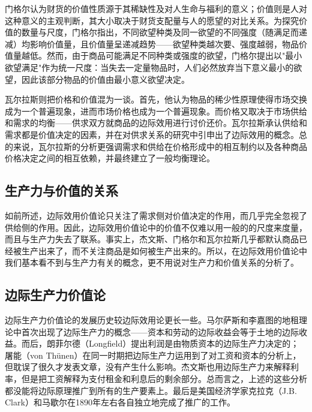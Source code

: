 门格尔认为财货的价值性质源于其稀缺性及对人生命与福利的意义；价值则是人对这种意义的主观判断，其大小取决于财货支配量与人的愿望的对比关系。为探究价值的数量与尺度，门格尔指出，不同欲望种类及同一欲望的不同强度（随满足而递减）均影响价值量，且价值量呈递减趋势——欲望种类越次要、强度越弱，物品价值量越低。然而，由于商品可能满足不同种类或强度的欲望，门格尔提出以"最小欲望满足"作为统一尺度：当失去一定量物品时，人们必然放弃当下意义最小的欲望，因此该部分物品的价值由最小意义欲望决定。\cite[167-172]{YanZhiJieCongBianJiGeMingDaoKaiEnSiGeMing2022}\cite[52-80]{QiaEr*MenGeErGuoMinJingJiXueYuanLi2024}

瓦尔拉斯则把价格和价值混为一谈。首先，他认为物品的稀少性原理使得市场交换成为一个普遍现象，进而市场价格也成为一个普遍现象。而价格又取决于市场供给和需求的均衡——供求双方就商品的边际效用进行讨价还价。瓦尔拉斯承认供给和需求都是价值决定的因素，并在对供求关系的研究中引申出了边际效用的概念。总的来说，瓦尔拉斯的分析更强调需求和供给在价格形成中的相互制约以及各种商品价格决定之间的相互依赖，并最终建立了一般均衡理论。\cite[181-188]{YanZhiJieCongBianJiGeMingDaoKaiEnSiGeMing2022}\cite[139-147]{LaiAng*WaErLaSiChunCuiJingJiXueYaoYi1989}

\subsection{生产力与价值的关系}

如前所述，边际效用价值论只关注了需求侧对价值决定的作用，而几乎完全忽视了供给侧的作用。因此，边际效用价值论中的价值不仅难以用一般的的尺度来度量，而且与生产力失去了联系。事实上，杰文斯、门格尔和瓦尔拉斯几乎都默认商品已经被生产出来了，而不关注商品是如何被生产出来的。所以，在边际效用价值论中我们基本看不到与生产力有关的概念，更不用说对生产力和价值关系的分析了。

\subsection{边际生产力价值论}

边际生产力价值论的发展历史较边际效用论更长一些。马尔萨斯和李嘉图的地租理论中首次出现了边际生产力的概念——资本和劳动的边际收益会等于土地的边际收益。而后，朗菲尔德（Longfield）提出利润是由物质资本的边际生产力决定的；屠能（von Thünen）在同一时期把边际生产力运用到了对工资和资本的分析上，但耽误了很久才发表文章，没有产生什么影响。杰文斯也用边际生产力来解释利率，但是把工资解释为支付租金和利息后的剩余部分。总而言之，上述的这些分析都没能将边际原理推广到所有的生产要素上。最后是美国经济学家克拉克（J.B. Clark）和马歇尔在1890年左右各自独立地完成了推广的工作。\cite[8222-8224]{macmillanpublishersltdNewPalgraveDictionary2018}

